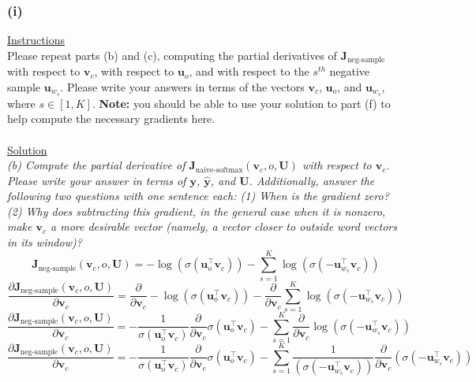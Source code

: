 \documentclass[12pt]{article}
\begin{document}
\subsubsection{(i)}
\underline{Instructions}
~\\
Please repeat parts (b) and (c), computing the partial derivatives of $\bm J_{\text{neg-sample}}$ 
with respect to $\bm v_c$, with respect to $\bm u_o$, and with respect to the $s^{th}$ negative sample 
$\bm u_{w_s}$. Please write your answers in terms of the vectors $\bm v_c$, $\bm u_o$, and $\bm u_{w_s}$, 
where $s \in [1, K]$. \textbf{Note:} you should be able to use your solution to part (f) to help compute the necessary gradients here.
~\\
~\\
\underline{Solution}
~\\
\emph{(b) Compute the partial derivative of $\bm J_{\text{naive-softmax}}(\bm v_c, o, \bm U)$ with respect to $\bm v_c$. 
Please write your answer in terms of $\bm y$, $\hat{\bm y}$, and $\bm U$. Additionally, answer the following 
two questions with one sentence each: (1) When is the gradient zero? (2) Why does subtracting this gradient, 
in the general case when it is nonzero, make $\bm v_c$ a more desirable vector (namely, a vector closer to 
outside word vectors in its window)?}
\begin{equation*}
    \bm J_{\text{neg-sample}}(\bm v_c, o, \bm U) = -\log(\sigma(\bm u_o^\top \bm v_c)) - \sum_{s=1}^K \log(\sigma(-\bm u_{w_s}^\top \bm v_c))
\end{equation*}
\begin{equation*}
    \frac{\partial \bm J_{\text{neg-sample}}(\bm v_c, o, \bm U)}{\partial \bm v_c} = 
    \frac{\partial}{\partial \bm v_c}
    -\log(\sigma(\bm u_o^\top \bm v_c)) - 
    \frac{\partial}{\partial \bm v_c}
    \sum_{s=1}^K \log(\sigma(-\bm u_{w_s}^\top \bm v_c))
\end{equation*}
\begin{equation*}
    \frac{\partial \bm J_{\text{neg-sample}}(\bm v_c, o, \bm U)}{\partial \bm v_c} = 
    - \frac{1}{\sigma(\bm u_o^\top \bm v_c)} 
    \frac{\partial}{\partial \bm v_c}
    \sigma(\bm u_o^\top \bm v_c) - 
    \sum_{s=1}^K 
    \frac{\partial}{\partial \bm v_c}
    \log(\sigma(-\bm u_{w_s}^\top \bm v_c))
\end{equation*}
\begin{equation*}
    \frac{\partial \bm J_{\text{neg-sample}}(\bm v_c, o, \bm U)}{\partial \bm v_c} = 
    - \frac{1}{\sigma(\bm u_o^\top \bm v_c)} 
    \frac{\partial}{\partial \bm v_c}
    \sigma(\bm u_o^\top \bm v_c) - 
    \sum_{s=1}^K \frac{1}{(\sigma(-\bm u_{w_s}^\top \bm v_c))}
    \frac{\partial}{\partial \bm v_c}
    (\sigma(-\bm u_{w_s}^\top \bm v_c))
\end{equation*}
\end{document}
